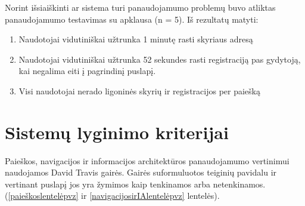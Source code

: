 \documentclass{VUMIFPSkursinis}
\begin{document}
Norint išsiaiškinti ar sistema turi panaudojamumo problemų buvo atliktas panaudojamumo testavimas su apklausa (n = 5). Iš rezultatų matyti:
\begin{enumerate}
\item Naudotojai vidutiniškai užtrunka 1 minutę rasti skyriaus adresą
\item Naudotojai vidutiniškai užtrunka 52 sekundes rasti registraciją pas gydytoją, kai negalima eiti į pagrindinį puslapį.
\item Visi naudotojai nerado ligoninės skyrių ir registracijos per paiešką
\end{enumerate}

\section{Sistemų lyginimo kriterijai}
Paieškos, navigacijos ir informacijos architektūros panaudojamumo vertinimui naudojamos David Travis gairės. Gairės suformuluotos teiginių pavidalu ir vertinant puslapį jos yra žymimos kaip tenkinamos arba netenkinamos\cite{SearchGuidelinesEn}\cite{NavigationAndIAGuidelinesEn}. (\ref{paieškoslentelėpvz} ir \ref{navigacijosirIAlentelėpvz} lentelės).
\end{document}
